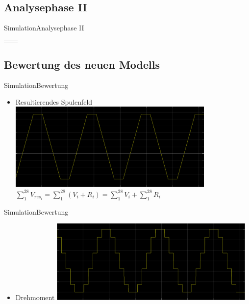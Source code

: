 	\subsection{Analysephase II}
	\begin{frame}{Simulation}{Analysephase II}
		\begin{center}
		\begin{tabular}{cc}
			\begin{minipage}{0.4\textwidth} 
				
			\end{minipage}	
			&  
			\begin{minipage}{0.4\textwidth}
				\vspace{-0.35cm}
					
			\end{minipage}	
			\\ 
		\end{tabular} 
	
		\vspace{0.5cm}
		
	\end{center}
	\end{frame}

	\subsection{Bewertung des neuen Modells}
	\begin{frame}{Simulation}{Bewertung}
		\begin{itemize}
			\item Resultierendes Spulenfeld
				\includegraphics[width=0.8\textwidth]{../sim/pictures/resultierendesFeld.png}
				\newline
				$\sum \limits_1^{28} V_{res_i} = \sum \limits_1^{28} (V_i+R_i) = \sum \limits_1^{28} V_i + \sum \limits_1^{28} R_i$
		\end{itemize}	 
	\end{frame}

	\begin{frame}{Simulation}{Bewertung}
		\begin{itemize}
			\item Drehmoment
			\includegraphics[width=0.8\textwidth]{../sim/pictures/drehmoment.png}
		\end{itemize}
	
	\end{frame}
